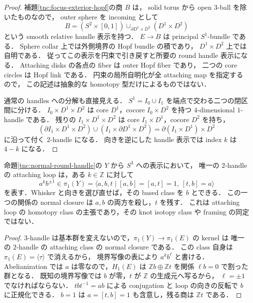 \begin{proof}
補題\ref{tnc:focus-exterior-hopf}の商 $B$ は，
solid torus から open $3$-ball を除いたものなので，
outer sphere を incoming として
\[
 B=(S^2\times[0,1])\cup_{\partial D^1\times D^2}(D^1\times D^2)
\]
という smooth relative handle 表示を持つ．
$E\to B$ は principal $S^1$-bundle である．
Sphere collar 上では外側境界の Hopf bundle の積であり，
$D^1\times D^2$ 上では自明である．
従ってこの表示を円束で引き戻すと所要の round handle 表示になる．
Attaching disks の各点の fiber は outer Hopf fiber であり，
二つの core circles は Hopf link である．
円束の局所自明化が全 attaching map を指定するので，
この記述は抽象的な homotopy 型だけによるものではない．

通常の handles への分解も直接見える．
$S^1=I_0\cup I_1$ を端点で交わる二つの閉区間に分ける．
$I_0\times D^1\times D^2$ は core $D^1$，cocore $I_0\times D^2$ を持つ
$4$-dimensional $1$-handle である．
残りの $I_1\times D^1\times D^2$ は core $I_1\times D^1$，cocore $D^2$ を持ち，
\[
 (\partial I_1\times D^1\times D^2)
 \cup(I_1\times\partial D^1\times D^2)
 =\partial(I_1\times D^1)\times D^2
\]
に沿って付く $2$-handle になる．
向きを逆にした handle 表示では index $k$ は $4-k$ になる．
\end{proof}

\begin{lemma}
\label{tnc:reverse-handle-loop}
命題\ref{tnc:normal-round-handle}の $Y$ から $S^3$ への表示において，
唯一の $2$-handle の attaching loop は，ある $k\in\mathbb Z$ に対して
\[
 a^k b^{\pm1}\in
 \pi_1(Y)=\langle a,b,t\mid[a,b]=[a,t]=1,\ [t,b]=a\rangle
\]
を表す．Whisker と向きを選び直せば，その based class を $b$ とできる．
この一つの関係の normal closure は $a,b$ の両方を殺し，$t$ を残す．
これは attaching loop の homotopy class の主張であり，その knot isotopy class や framing の同定ではない．
\end{lemma}

\begin{proof}
$3$-handle は基本群を変えないので，$\pi_1(Y)\to\pi_1(E)$ の kernel は
唯一の $2$-handle の attaching class の normal closure である．
この class 自身は $\pi_1(E)=\langle\tau\rangle$ で消えるから，
境界写像の表により $a^k b^\ell$ と書ける．
Abelianization では $a$ は零なので，$H_1(E)$ は
$\mathbb Z b\oplus\mathbb Z t$ を関係 $\ell b=0$ で割った群となる．
既知の境界写像では $b$ が零，$t$ が $\mathbb Z$ の生成元へ写るから，
$\ell=\pm1$ でなければならない．
$tbt^{-1}=ab$ による conjugation と loop の向きの反転で $b$ に正規化できる．
$b=1$ は $a=[t,b]=1$ も含意し，残る商は $\mathbb Z t$ である．
\end{proof}

